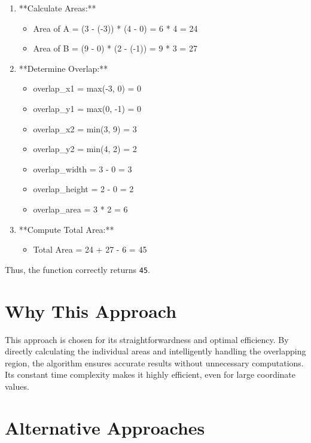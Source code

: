 \begin{enumerate}
    \item **Calculate Areas:**
    \begin{itemize}
        \item Area of A = (3 - (-3)) * (4 - 0) = 6 * 4 = 24
        \item Area of B = (9 - 0) * (2 - (-1)) = 9 * 3 = 27
    \end{itemize}
    
    \item **Determine Overlap:**
    \begin{itemize}
        \item overlap\_x1 = max(-3, 0) = 0
        \item overlap\_y1 = max(0, -1) = 0
        \item overlap\_x2 = min(3, 9) = 3
        \item overlap\_y2 = min(4, 2) = 2
        \item overlap\_width = 3 - 0 = 3
        \item overlap\_height = 2 - 0 = 2
        \item overlap\_area = 3 * 2 = 6
    \end{itemize}
    
    \item **Compute Total Area:**
    \begin{itemize}
        \item Total Area = 24 + 27 - 6 = 45
    \end{itemize}
\end{enumerate}

Thus, the function correctly returns \texttt{45}.

\section*{Why This Approach}

This approach is chosen for its straightforwardness and optimal efficiency. By directly calculating the individual areas and intelligently handling the overlapping region, the algorithm ensures accurate results without unnecessary computations. Its constant time complexity makes it highly efficient, even for large coordinate values.

\section*{Alternative Approaches}

